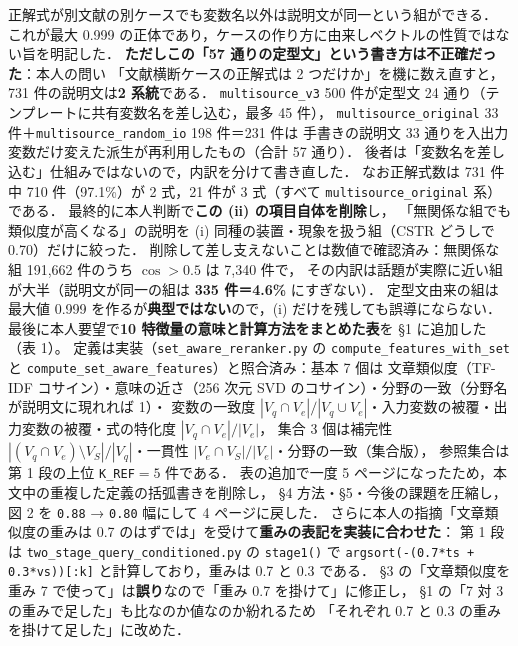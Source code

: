 \documentclass[11pt,a4paper]{jsarticle}
\begin{document}
\begin{itemize}[nosep]
    正解式が別文献の別ケースでも変数名以外は説明文が同一という組ができる．
    これが最大 0.999 の正体であり，ケースの作り方に由来しベクトルの性質ではない旨を明記した．
    \textbf{ただしこの「57 通りの定型文」という書き方は不正確だった}：本人の問い
    「文献横断ケースの正解式は 2 つだけか」を機に数え直すと，731 件の説明文は\textbf{2 系統}である．
    \texttt{multisource\_v3} 500 件が定型文 24 通り（テンプレートに共有変数名を差し込む，最多 45 件），
    \texttt{multisource\_original} 33 件＋\texttt{multisource\_random\_io} 198 件＝231 件は
    手書きの説明文 33 通りを入出力変数だけ変えた派生が再利用したもの（合計 57 通り）．
    後者は「変数名を差し込む」仕組みではないので，内訳を分けて書き直した．
    なお正解式数は 731 件中 710 件（97.1\%）が 2 式，21 件が 3 式（すべて \texttt{multisource\_original} 系）である．
    最終的に本人判断で\textbf{この (ii) の項目自体を削除}し，
    「無関係な組でも類似度が高くなる」の説明を (i) 同種の装置・現象を扱う組（CSTR どうしで 0.70）だけに絞った．
    削除して差し支えないことは数値で確認済み：無関係な組 191,662 件のうち $\cos>0.5$ は 7,340 件で，
    その内訳は話題が実際に近い組が大半（説明文が同一の組は \textbf{335 件＝4.6\%} にすぎない）．
    定型文由来の組は最大値 0.999 を作るが\textbf{典型ではない}ので，(i) だけを残しても誤導にならない．
    最後に本人要望で\textbf{10 特徴量の意味と計算方法をまとめた表}を \S 1 に追加した（表 1）。
    定義は実装（\texttt{set\_aware\_reranker.py} の \texttt{compute\_features\_with\_set} と
    \texttt{compute\_set\_aware\_features}）と照合済み：基本 7 個は
    文章類似度（TF-IDF コサイン）・意味の近さ（256 次元 SVD のコサイン）・分野の一致（分野名が説明文に現れれば 1）・
    変数の一致度 $|V_q\cap V_e|/|V_q\cup V_e|$・入力変数の被覆・出力変数の被覆・式の特化度 $|V_q\cap V_e|/|V_e|$，
    集合 3 個は補完性 $|(V_q\cap V_e)\setminus V_S|/|V_q|$・一貫性 $|V_e\cap V_S|/|V_e|$・分野の一致（集合版），
    参照集合は第 1 段の上位 \texttt{K\_REF}$=5$ 件である．
    表の追加で一度 5 ページになったため，本文中の重複した定義の括弧書きを削除し，
    \S 4 方法・\S 5・今後の課題を圧縮し，図 2 を \texttt{0.88} → \texttt{0.80} 幅にして 4 ページに戻した．
    さらに本人の指摘「文章類似度の重みは 0.7 のはずでは」を受けて\textbf{重みの表記を実装に合わせた}：
    第 1 段は \texttt{two\_stage\_query\_conditioned.py} の \texttt{stage1()} で
    \texttt{argsort(-(0.7*ts + 0.3*vs))[:k]} と計算しており，重みは 0.7 と 0.3 である．
    \S 3 の「文章類似度を重み 7 で使って」は\textbf{誤り}なので「重み 0.7 を掛けて」に修正し，
    \S 1 の「7 対 3 の重みで足した」も比なのか値なのか紛れるため
    「それぞれ 0.7 と 0.3 の重みを掛けて足した」に改めた．

\end{itemize}
\end{document}
